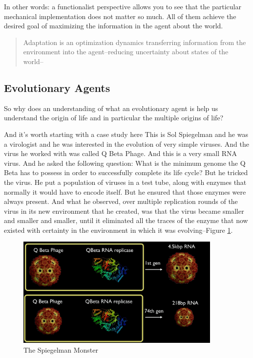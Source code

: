 \documentclass[]{article}
\begin{document}
In other words: a functionalist perspective allows you to see
that the particular mechanical implementation does not matter so much.
All of them achieve the desired goal of maximizing the information in the agent about the world.

\begin{quotation}
	Adaptation is an optimization dynamics transferring information from the environment into the agent--reducing uncertainty about states of the world--\cite{rockmore2018cultural}
\end{quotation}

\subsection{Evolutionary Agents}
So why does an understanding
of what an evolutionary agent is
help us understand the origin of life
and in particular
the multiple origins of life?

And it's worth starting
with a case study here
This is Sol Spiegelman
and he was a virologist
and he was interested in the evolution
of very simple viruses.
And the virus he worked with
was called Q Beta Phage.
And this is a very small RNA virus.
And he asked the following question:
What is the minimum genome
the Q Beta has to possess
in order to successfully complete
its life cycle? But he tricked the virus.
He put a population of viruses
in a test tube, along with enzymes
that normally
it would have to encode itself.
But he ensured that those enzymes
were always present.
And what he observed, over multiple
replication rounds of the virus
in its new environment that he created,
was that the virus became
smaller and smaller and smaller,
until it eliminated all the traces
of the enzyme that now existed
with certainty in the environment
in which it was evolving--Figure \ref{fig:SpiegelmanMonster}. 
\begin{figure}[H]
	\caption{The Spiegelman Monster}\label{fig:SpiegelmanMonster}
	\includegraphics[width=0.9\textwidth]{SpiegelmanMonster}
\end{figure}
\end{document}
